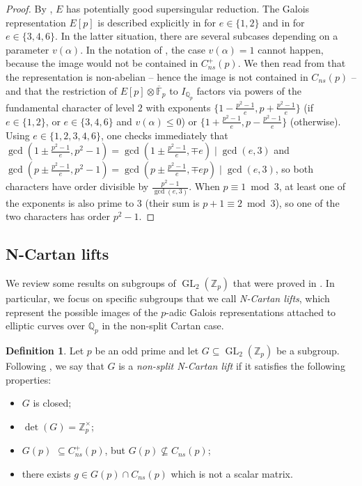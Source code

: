\documentclass{amsart}
\newcommand{\op}[1]{\operatorname{#1}}
\theoremstyle{definition}
\newtheorem{definition}[theorem]{Definition}
\newcommand{\Z}{\mathbb{Z}}
\newcommand{\Q}{\mathbb{Q}}
\newcommand{\GL}{\operatorname{GL}}
\numberwithin{theorem}{section}
\numberwithin{equation}{section}
\begin{document}
\begin{proof}
By , $E$ has potentially good supersingular reduction. The Galois representation $E[p]$ is described explicitly in \cite[\S B.2.2]{Volkov} for $e \in \{1,2\}$ and in \cite[\S B.3.2.3]{Volkov} for $e \in \{3,4,6\}$. In the latter situation, there are several subcases depending on a parameter $v(\alpha)$. In the notation of \cite[p.~132]{Volkov}, the case $v(\alpha)=1$ cannot happen, because the image would not be contained in $C_{ns}^+(p)$. We then read from \cite{Volkov} that the representation is non-abelian -- hence the image is not contained in $C_{ns}(p)$ -- and that the restriction of $E[p] \otimes \overline{\mathbb{F}}_p$ to $I_{\Q_p}$ factors via powers of the fundamental character of level $2$ with exponents $\{1 - \frac{p^2-1}{e}, p+\frac{p^2-1}{e}\}$ (if $e \in \{1,2\}$, or $e \in \{3,4,6\}$ and $v(\alpha) \leq 0$) or $\{1 + \frac{p^2-1}{e}, p-\frac{p^2-1}{e}\}$ (otherwise). Using $e \in \{1,2,3,4,6\}$, one checks immediately that $\gcd\left( 1 \pm \frac{p^2-1}{e}, p^2-1 \right)=\gcd( 1 \pm \frac{p^2-1}{e},\mp e) \mid \gcd(e,3)$ and $\gcd\left( p \pm \frac{p^2-1}{e}, p^2-1 \right) = \gcd(p \pm \frac{p^2-1}{e}, \mp ep) \mid \gcd(e,3)$, so both characters have order divisible by $\frac{p^2-1}{\gcd(e, 3)}$. When $p \equiv 1 \bmod 3$, at least one of the exponents is also prime to $3$ (their sum is $p+1 \equiv 2 \bmod 3$), so one of the two characters has order $p^2-1$.
\end{proof}


\subsection{N-Cartan lifts}
We review some results on subgroups of $\op{GL}_2(\mathbb{Z}_p)$ that were proved in \cite{furio24}. In particular, we focus on specific subgroups that we call \textit{N-Cartan lifts}, which represent the possible images of the $p$-adic Galois representations attached to elliptic curves over $\Q_p$ in the non-split Cartan case.
\begin{definition}
	Let $p$ be an odd prime and let $G \subseteq \GL_2(\Z_p)$ be a subgroup. Following \cite[Definition 3.6]{furio24}, we say that $G$ is a \textit{non-split N-Cartan lift} if it satisfies the following properties:
	\begin{itemize}
		\item $G$ is closed;
		\item $\det(G) = \Z_p^\times$;
		\item $G(p)$ $\subseteq C_{ns}^+(p)$, but $G(p) \not\subseteq C_{ns}(p)$;
		\item there exists $g \in G(p) \cap C_{ns}(p)$ which is not a scalar matrix.
	\end{itemize}
\end{definition}
\end{document}
